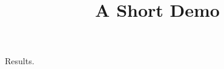 \documentclass[article]{jss}
\title{A Short Demo}
\begin{document}
\begin{table}
Results.
\caption{\label{tab:ov} \emph{Overview of the regression models}.}
\end{table}
\end{document}
